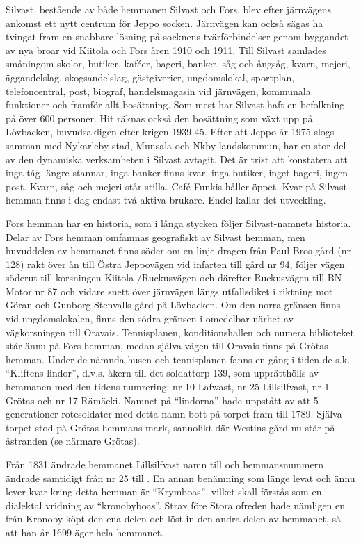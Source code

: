 Silvast, bestående av både hemmanen Silvast och Fors, blev efter järnvägens ankomst ett nytt centrum för Jeppo socken. Järnvägen kan också sägas ha tvingat fram en snabbare lösning på socknens tvärförbindelser genom byggandet av nya broar vid Kiitola och Fors åren 1910 och 1911. Till Silvast samlades småningom skolor, butiker, kaféer, bageri, banker, såg och ångsåg, kvarn, mejeri, äggandelslag, skogsandelslag, gästgiverier, ungdomslokal, sportplan, telefoncentral, post, biograf, handelsmagasin vid järnvägen, kommunala funktioner och framför allt bosättning. Som mest har Silvast haft en befolkning på över 600 personer. Hit räknas också den bosättning som växt upp på Lövbacken, huvudsakligen efter krigen 1939-45. Efter att Jeppo år 1975 slogs samman med Nykarleby stad, Munsala och Nkby landskommun, har en stor del av den dynamiska verksamheten i  Silvast avtagit. Det är trist att konstatera att inga tåg längre stannar, inga banker finns kvar, inga butiker, inget bageri, ingen post. Kvarn, såg och mejeri står stilla. Café Funkis håller öppet. Kvar på Silvast hemman finns i dag endast två aktiva brukare. Endel kallar det utveckling.



Fors hemman har en historia, som i långa stycken följer Silvast-namnets historia. Delar av Fors hemman omfamnas geografiskt av Silvast hemman, men huvuddelen av hemmanet finns söder om en linje dragen från Paul Bros gård (nr 128) rakt över ån till Östra Jeppovägen vid infarten till gård nr 94, följer vägen söderut till korsningen Kiitola-/Ruckusvägen och därefter Ruckusvägen till BN-Motor nr 87 och vidare snett över järnvägen längs utfallsdiket i riktning mot Göran och Gunborg Stenvalls gård på Lövbacken. Om den norra gränsen finns vid ungdomslokalen, finns den södra gränsen i omedelbar närhet av vägkorsningen till Oravais. Tennisplanen, konditionshallen och numera biblioteket står ännu på Fors hemman, medan själva vägen till Oravais finns på Grötas hemman. Under de nämnda husen och tennisplanen fanns en gång i tiden de s.k. ``Kliftens lindor'', d.v.s. åkern till det soldattorp 139, som upprätthölls av hemmanen med den tidens numrering: nr 10 Lafwast, nr 25 Lillsilfvast, nr 1 Grötas och nr 17 Rämäcki. Namnet på ``lindorna'' hade uppstått av att 5 generationer rotesoldater med detta namn bott på torpet fram till 1789. Själva torpet stod på Grötas hemmans mark, sannolikt där Westins gård nu står på åstranden (se närmare Grötas).

Från 1831 ändrade hemmanet Lillsilfvast namn till  och hemmansnummern ändrade samtidigt från nr 25  till . En annan benämning som länge levat och ännu lever kvar kring detta hemman är ``Krymboas'', vilket skall förstås som en dialektal vridning  av ``kronobyboas''. Strax före Stora ofreden hade nämligen en  från Kronoby köpt den ena delen och löst in den andra delen av hemmanet, så att han år 1699 äger hela hemmanet.

